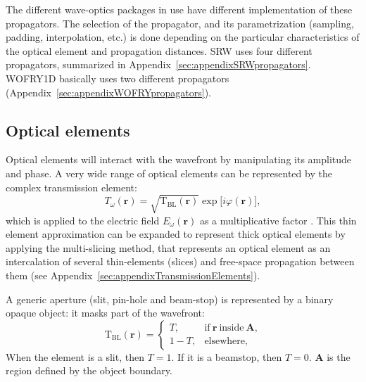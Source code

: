 \documentclass{iucr}              %
\begin{document}
The different wave-optics packages in use have different implementation of these propagators. The selection of the propagator, and its parametrization (sampling, padding, interpolation, etc.) is done depending on the particular characteristics of the optical element and propagation distances. SRW uses four different propagators, summarized in Appendix~\ref{sec:appendixSRWpropagators}. WOFRY1D basically uses two different propagators (Appendix~\ref{sec:appendixWOFRYpropagators}).   

\subsection{Optical elements}\label{sec:OE}

Optical elements will interact with the wavefront by manipulating its amplitude and phase. A very wide range of optical elements can be represented by the complex transmission element:
 \begin{equation}\label{eq:trans_el}
T_\omega(\textbf{r})=\sqrt{\mathrm{T}_\mathrm{BL}(\textbf{r})}\exp{\big[ i\varphi(\textbf{r})\big]},
\end{equation}
which is applied to the electric field $E_\omega(\textbf{r})$ as a multiplicative factor \cite{Cloetens_1996}. This thin element approximation can be expanded to represent thick optical elements by applying the multi-slicing method, that represents an optical element as an intercalation of several thin-elements (slices) and free-space propagation between them \cite{paganin_book, Li2017, Munro2019} (see Appendix~\ref{sec:appendixTransmissionElements}). 

A generic aperture (slit, pin-hole and beam-stop) is represented by a binary opaque object: it masks part of the wavefront:
\begin{equation}\label{eq:slit}
    \mathrm{T}_{\text{BL}}(\textbf{r}) = 
        \begin{cases}
      T, & \text{if}~\textbf{r}~\text{inside}~\textbf{A},\\
      1-T, &\text{elsewhere},
        \end{cases}
\end{equation}
When the element is a slit, then $T=1$. If it is a beamstop, then $T=0$. $\textbf{A}$ is the region defined by the object boundary. 
\end{document}
